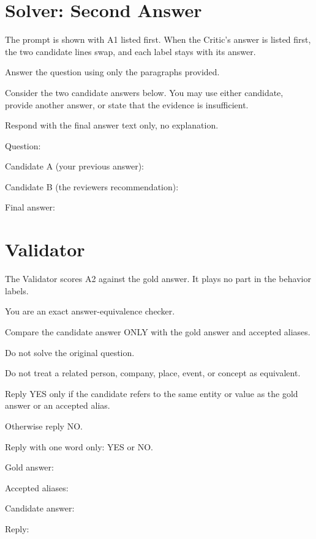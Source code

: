 \section{Solver: Second Answer}

The prompt is shown with A1 listed first. When the Critic's answer is listed
first, the two candidate lines swap, and each label stays with its answer.

\begin{promptbox}
Answer the question using only the paragraphs provided.\par
Consider the two candidate answers below. You may use either candidate, provide another answer, or state that the evidence is insufficient.\par
Respond with the final answer text only, no explanation.\par
\promptblank
{}\par
\promptblank
Question: \par
Candidate A (your previous answer): \par
Candidate B (the reviewer\textquotesingle{}s recommendation): \par
Final answer:\par
\end{promptbox}

\section{Validator}

The Validator scores A2 against the gold answer. It plays no part in the
behavior labels.

\begin{promptbox}
You are an exact answer-equivalence checker.\par
Compare the candidate answer ONLY with the gold answer and accepted aliases.\par
Do not solve the original question.\par
Do not treat a related person, company, place, event, or concept as equivalent.\par
Reply YES only if the candidate refers to the same entity or value as the gold answer or an accepted alias.\par
Otherwise reply NO.\par
Reply with one word only: YES or NO.\par
\promptblank
Gold answer: \par
Accepted aliases: \par
Candidate answer: \par
Reply:\par
\end{promptbox}


